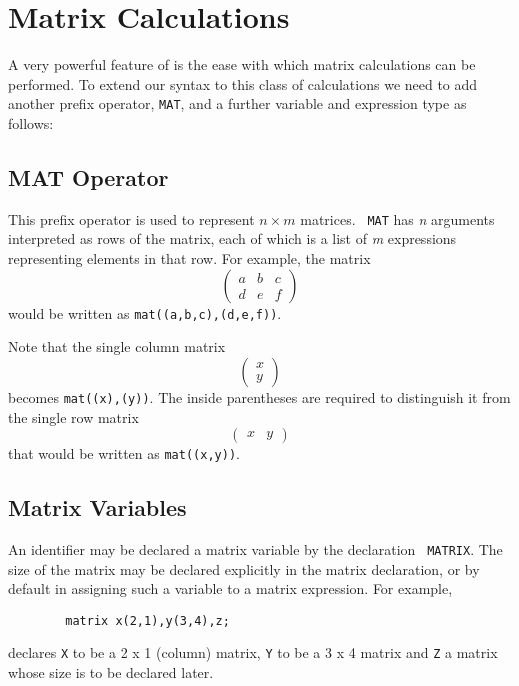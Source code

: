 \chapter{Matrix Calculations} 
A very powerful feature of {\REDUCE} is the ease with which matrix
calculations can be performed. To extend our syntax to this class of
calculations we need to add another prefix operator, {\tt MAT},
 and a further
variable and expression type as follows:

\section{MAT Operator}
This prefix operator is used to represent $n\times m$ matrices. {\tt
MAT} has {\em n} arguments interpreted as rows of the matrix, each of
which is a list of {\em m} expressions representing elements in that row.
For example, the matrix
\[ \left( \begin{array}{lcr} a & b & c \\ d & e & f \end{array} \right) \]
would be written as {\tt mat((a,b,c),(d,e,f))}.

Note that the single column matrix
\[ \left( \begin{array}{c} x \\ y \end{array} \right) \]
becomes {\tt mat((x),(y))}.  The inside parentheses are required to
distinguish it from the single row matrix
\[ \left( \begin{array}{lr} x & y \end{array} \right) \]
that would be written as {\tt mat((x,y))}.

\section{Matrix Variables}

An identifier may be declared a matrix variable by the declaration {\tt
MATRIX}.
The size of the matrix may be declared explicitly in the matrix
declaration, or by default in assigning such a variable to a matrix
expression. For example,
\begin{verbatim}
        matrix x(2,1),y(3,4),z;
\end{verbatim}
declares {\tt X} to be a 2 x 1 (column) matrix, {\tt Y} to be a 3 x 4
matrix and {\tt Z} a matrix whose size is to be declared later.

